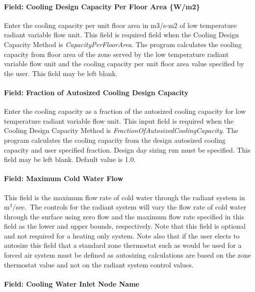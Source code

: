 \paragraph{Field: Cooling Design Capacity Per Floor Area \{W/m2\}}\label{field-cooling-design-capacity-per-floor-area-wm2-000}

Enter the cooling capacity per unit floor area in m3/s-m2 of low temperature radiant variable flow unit. This field is required field when the Cooling Design Capacity Method is \emph{CapacityPerFloorArea}. The program calculates the cooling capacity from floor area of the zone served by the low temperature radiant variable flow unit and the cooling capacity per unit floor area value specified by the user. This field may be left blank.

\paragraph{Field: Fraction of Autosized Cooling Design Capacity}\label{field-fraction-of-autosized-cooling-design-capacity-000}

Enter the cooling capacity as a fraction of the autosized cooling capacity for low temperature radiant variable flow unit. This input field is required when the Cooling Design Capacity Method is \emph{FractionOfAutosizedCoolingCapacity}. The program calculates the cooling capacity from the design autosized cooling capacity and user specified fraction. Design day sizing run must be specified. This field may be left blank. Default value is 1.0.

\paragraph{Field: Maximum Cold Water Flow}\label{field-maximum-cold-water-flow}

This field is the maximum flow rate of cold water through the radiant system in m\(^{3}\)/sec.~The controls for the radiant system will vary the flow rate of cold water through the surface using zero flow and the maximum flow rate specified in this field as the lower and upper bounds, respectively. Note that this field is optional and not required for a heating only system. Note also that if the user elects to autosize this field that a standard zone thermostat such as would be used for a forced air system must be defined as autosizing calculations are based on the zone thermostat value and not on the radiant system control values.

\paragraph{Field: Cooling Water Inlet Node Name}\label{field-cooling-water-inlet-node-name-000}


